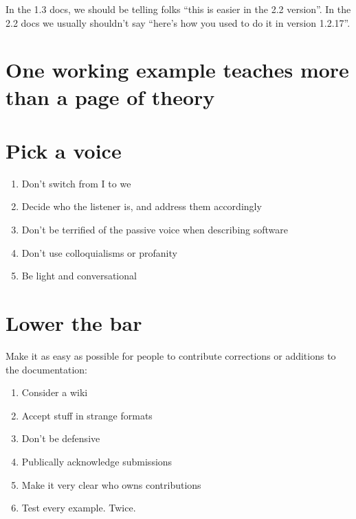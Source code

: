 In the 1.3 docs, we should be telling folks ``this is easier in the 2.2
version''. In the 2.2 docs we usually shouldn't say ``here's how you
used to do it in version 1.2.17''.

\section{One working example teaches more than a page of theory}

\section{Pick a voice}
\begin{enumerate}
\item Don't switch from I to we
\item Decide who the listener is, and address them accordingly
\item Don't be terrified of the passive voice when describing software
\item Don't use colloquialisms or profanity
\item Be light and conversational
\end{enumerate}

\section{Lower the bar}

Make it as easy as possible for people to contribute corrections or
additions to the documentation:
\begin{enumerate}
\item Consider a wiki
\item Accept stuff in strange formats
\item Don't be defensive
\item Publically acknowledge submissions
\item Make it very clear who owns contributions
\item Test every example. Twice.
\end{enumerate}


